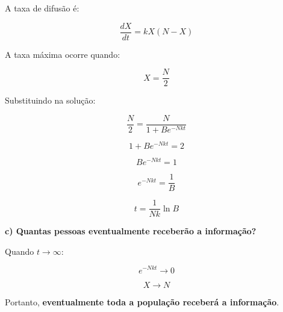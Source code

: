\documentclass{article}
\begin{document}
A taxa de difusão é:

\[
\frac{dX}{dt} = k X (N - X)
\]

A taxa máxima ocorre quando:

\[
X = \frac{N}{2}
\]

Substituindo na solução:

\[
\frac{N}{2} = \frac{N}{1 + B e^{-N k t}}
\]

\[
1 + B e^{-N k t} = 2
\]

\[
B e^{-N k t} = 1
\]

\[
e^{-N k t} = \frac{1}{B}
\]

\[
t = \frac{1}{N k} \ln B
\]

\bigskip

\textbf{c) Quantas pessoas eventualmente receberão a informação?}

Quando $t \to \infty$:

\[
e^{-N k t} \to 0
\]

\[
X \to N
\]

Portanto, \textbf{eventualmente toda a população receberá a informação}.
\end{document}
